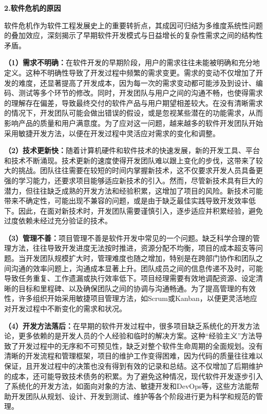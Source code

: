 \documentclass[12pt,a4paper]{ctexbook}
\begin{document}
\textbf{2.软件危机的原因}

软件危机作为软件工程发展史上的重要转折点，其成因可归结为多维度系统性问题的叠加效应，深刻揭示了早期软件开发模式与日益增长的复杂性需求之间的结构性矛盾。

\textbf{（1）需求不明确：}在软件开发的早期阶段，用户的需求往往未能被明确和充分地定义。这种不明确性导致了开发过程中频繁的需求变更。需求的变动不仅增加了开发的难度，还显著提高了开发成本，因为每一次的需求变动都可能涉及到设计、编码、测试等多个环节的修改。同时，开发团队与用户之间的沟通不畅，也使得需求的理解存在偏差，导致最终交付的软件产品与用户期望相差较大。在没有清晰需求的情况下，开发团队可能会做出错误的假设，或是忽视某些潜在的功能需求，从而影响产品的质量和用户满意度。为了应对这一问题，越来越多的软件开发团队开始采用敏捷开发方法，以便在开发过程中灵活应对需求的变化和调整。

\textbf{（2）技术更新快：}随着计算机硬件和软件技术的快速发展，新的开发工具、平台和技术不断涌现。技术更新的速度使得开发团队难以跟上变化的步伐，这带来了较大的挑战。团队往往需要在较短的时间内掌握新技术，这不仅要求开发人员具备更强的学习能力，还要求项目能够适应新技术的引入。然而，尽管新技术具有巨大的潜力，但往往缺乏成熟的开发方法和经验积累，这增加了项目的风险。新技术可能带来不确定性，可能出现不兼容的问题，或是由于缺乏最佳实践导致开发效率低下。因此，在面对新技术时，开发团队需要谨慎引入，逐步适应并积累经验，避免过度依赖未经过充分验证的技术。

\textbf{（3）管理不善：}项目管理不善是软件开发中常见的一个问题。缺乏科学合理的管理方法，往往导致开发进度无法按时推进，资源分配不均衡，项目的成本超支等问题。当开发团队规模扩大时，管理难度也随之增加，特别是在跨部门协作和团队之间沟通的效率问题上，沟通成本显著上升。团队成员之间的信息传递不及时，可能导致任务重复、工作遗漏或执行效率低下。项目经理需要有效地调配资源、设定清晰的目标和里程碑、以及确保团队之间的协调与沟通畅通。为了提高管理的有效性，许多组织开始采用敏捷项目管理方法，如Scrum或Kanban，以便更灵活地应对开发过程中不断变化的需求和状况。

\textbf{（4）开发方法落后：}在早期的软件开发过程中，很多项目缺乏系统化的开发方法论，更多依赖的是开发人员的个人经验和临时的解决方案。这种``经验主义''方法导致了开发过程中的无序和不可预见性，缺乏对整个软件生命周期的全面规划。没有清晰的开发流程和管理框架，项目的维护工作变得困难，因为代码的质量往往难以保证，且开发过程中的决策也没有得到有效的记录和总结。这不仅增加了后期维护的成本，还可能导致技术债务的积累。为了避免这种情况，现代软件开发逐步引入了系统化的开发方法，如面向对象的方法、敏捷开发和DevOps等，这些方法能帮助开发团队从规划、设计、开发到测试、维护等各个阶段进行更为科学和规范的管理。
\end{document}

